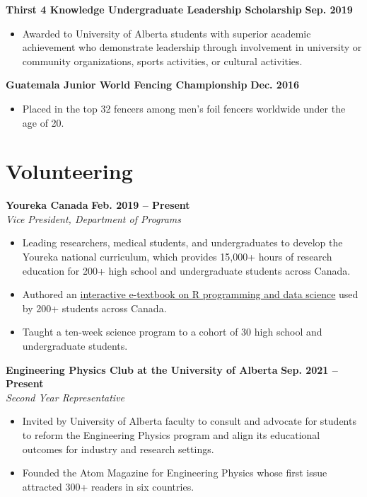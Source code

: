 \documentclass{article}
\begin{document}
\textbf{Thirst 4 Knowledge Undergraduate Leadership Scholarship} \hfill \textbf{Sep. 2019}
\begin{itemize}
    \item Awarded to University of Alberta students with superior academic achievement who demonstrate leadership through involvement in university or community organizations, sports activities, or cultural activities.
\end{itemize} \vspace{1em}

\textbf{Guatemala Junior World Fencing Championship} \hfill \textbf{Dec. 2016}
\begin{itemize}
    \item Placed in the top 32 fencers among men’s foil fencers worldwide under the age of 20.
\end{itemize}


\section*{\textcolor{my_colour}{Volunteering}}
\vspace{-.25em} \hrulefill \vspace{.25em}

\textbf{Youreka Canada} \hfill \textbf{Feb. 2019 -- Present} \\
\textit{Vice President, Department of Programs}
\begin{itemize}
    \item Leading researchers, medical students, and undergraduates to develop the Youreka national curriculum, which provides 15,000+ hours of research education for 200+ high school and undergraduate students across Canada.
    \item Authored an \href{https://youreka-textbook.netlify.app/}{interactive e-textbook on R programming and data science} used by 200+ students across Canada.
    \item Taught a ten-week science program to a cohort of 30 high school and undergraduate students.
\end{itemize} \vspace{1em}

\textbf{Engineering Physics Club at the University of Alberta} \hfill \textbf{Sep. 2021 -- Present} \\
\textit{Second Year Representative}
\begin{itemize}
    \item Invited by University of Alberta faculty to consult and advocate for students to reform the Engineering Physics program and align its educational outcomes for industry and research settings.
    \item Founded the Atom Magazine for Engineering Physics whose first issue attracted 300+ readers in six countries.
\end{itemize} \vspace{1em}
\end{document}
